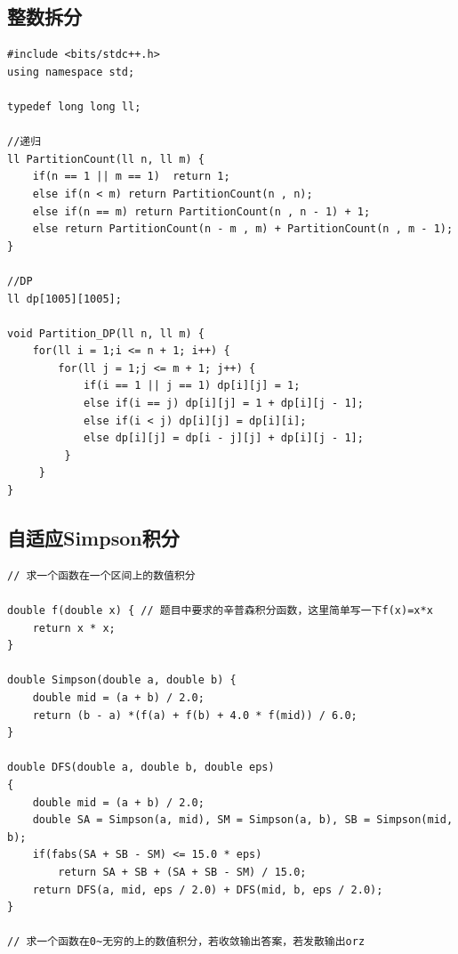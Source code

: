 \documentclass[twoside]{article}
\begin{document}
\subsection{整数拆分}
\begin{lstlisting}
#include <bits/stdc++.h>
using namespace std;

typedef long long ll;

//递归
ll PartitionCount(ll n, ll m) {
    if(n == 1 || m == 1)  return 1;
    else if(n < m) return PartitionCount(n , n);
    else if(n == m) return PartitionCount(n , n - 1) + 1;
    else return PartitionCount(n - m , m) + PartitionCount(n , m - 1);
}

//DP
ll dp[1005][1005];

void Partition_DP(ll n, ll m) {
    for(ll i = 1;i <= n + 1; i++) {
        for(ll j = 1;j <= m + 1; j++) {
            if(i == 1 || j == 1) dp[i][j] = 1;
            else if(i == j) dp[i][j] = 1 + dp[i][j - 1];
            else if(i < j) dp[i][j] = dp[i][i];
            else dp[i][j] = dp[i - j][j] + dp[i][j - 1];
         }
     }
}\end{lstlisting}
\subsection{自适应Simpson积分}
\begin{lstlisting}
// 求一个函数在一个区间上的数值积分

double f(double x) { // 题目中要求的辛普森积分函数，这里简单写一下f(x)=x*x
    return x * x;
}

double Simpson(double a, double b) {
    double mid = (a + b) / 2.0;
    return (b - a) *(f(a) + f(b) + 4.0 * f(mid)) / 6.0;
}

double DFS(double a, double b, double eps)
{
    double mid = (a + b) / 2.0;
    double SA = Simpson(a, mid), SM = Simpson(a, b), SB = Simpson(mid, b);
    if(fabs(SA + SB - SM) <= 15.0 * eps) 
        return SA + SB + (SA + SB - SM) / 15.0;
    return DFS(a, mid, eps / 2.0) + DFS(mid, b, eps / 2.0);
}

// 求一个函数在0~无穷的上的数值积分，若收敛输出答案，若发散输出orz\end{lstlisting}
\end{document}
